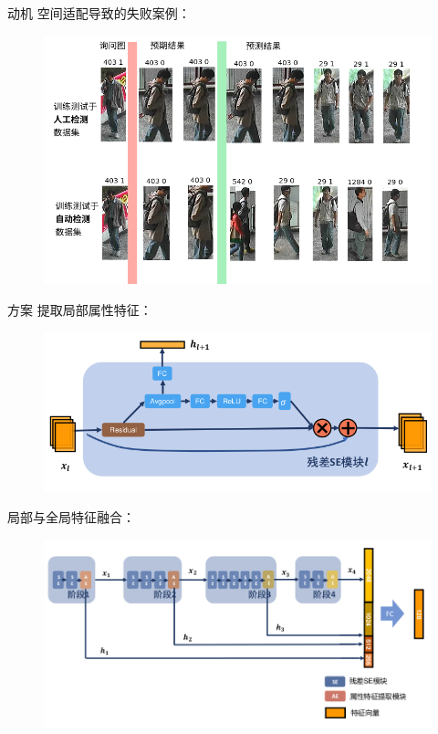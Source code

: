\documentclass[notes]{beamer}
\begin{document}
\begin{frame}{动机}
	空间适配导致的失败案例：
	\begin{figure}
		\centering
		\includegraphics[width=\textwidth]{fig/2018-04-18-21-53-15.png}
		\label{fig:label2det}
	\end{figure}
\end{frame}

\begin{frame}{方案}
	提取局部属性特征：
	\begin{figure}
		\centering
		\includegraphics[width=.7\textwidth]{fig/2018-05-11-16-53-10.png}
		\label{fig:resse}
	\end{figure}
	局部与全局特征融合：
	\begin{figure}
		\centering
		\includegraphics[width=.92\textwidth]{fig/2018-05-11-16-54-07.png}
		\label{fig:fusion}
	\end{figure}
\end{frame}
\end{document}

